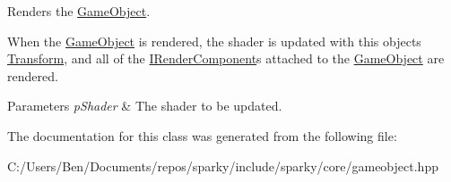 Renders the \hyperlink{classsparky_1_1_game_object}{Game\+Object}. 

When the \hyperlink{classsparky_1_1_game_object}{Game\+Object} is rendered, the shader is updated with this objects \hyperlink{classsparky_1_1_transform}{Transform}, and all of the \hyperlink{classsparky_1_1_i_render_component}{I\+Render\+Component}\textquotesingle{}s attached to the \hyperlink{classsparky_1_1_game_object}{Game\+Object} are rendered.


\begin{DoxyParams}{Parameters}
{\em p\+Shader} & The shader to be updated. \\
\hline
\end{DoxyParams}


The documentation for this class was generated from the following file\+:\begin{DoxyCompactItemize}
\item 
C\+:/\+Users/\+Ben/\+Documents/repos/sparky/include/sparky/core/gameobject.\+hpp\end{DoxyCompactItemize}

